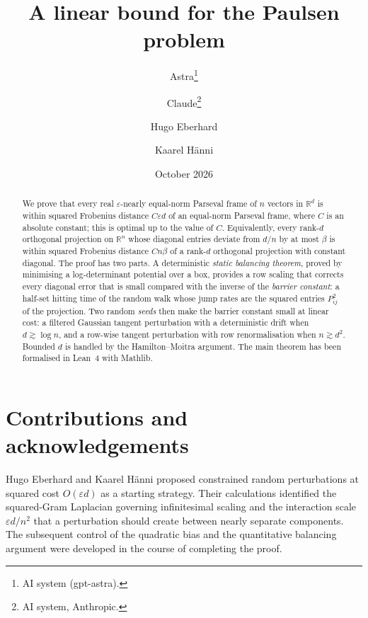 \documentclass[11pt]{article}
\title{A linear bound for the Paulsen problem}
\author{Astra\thanks{AI system (gpt-astra).}
\and Claude\thanks{AI system, Anthropic.}
\and Hugo Eberhard
\and Kaarel H\"anni}
\date{October 2026}
\theoremstyle{definition}
\theoremstyle{remark}
\newcommand{\R}{\mathbb R}
\newcommand{\eps}{\varepsilon}
\numberwithin{equation}{section}
\begin{document}
\maketitle
\vspace{-1.5em}
\begin{abstract}
We prove that every real $\eps$-nearly equal-norm Parseval frame of $n$ vectors
in $\R^d$ is within squared Frobenius distance $C\eps d$ of an equal-norm
Parseval frame, where $C$ is an absolute constant; this is optimal up to the
value of $C$. Equivalently, every rank-$d$ orthogonal projection on $\R^n$ whose
diagonal entries deviate from $d/n$ by at most $\beta$ is within squared
Frobenius distance $Cn\beta$ of a rank-$d$ orthogonal projection with constant
diagonal. The proof has two parts. A deterministic \emph{static balancing
theorem}, proved by minimising a log-determinant potential over a box, provides
a row scaling that corrects every diagonal error that is small compared with the
inverse of the \emph{barrier constant}: a half-set hitting time of the random
walk whose jump rates are the squared entries $P_{ij}^2$ of the projection. Two random \emph{seeds} then make the barrier
constant small at linear cost: a filtered Gaussian tangent perturbation with a
deterministic drift when $d\gtrsim\log n$, and a row-wise tangent perturbation
with row renormalisation when $n\gtrsim d^2$. Bounded $d$ is handled by the
Hamilton--Moitra argument. The main theorem has been formalised in Lean~4 with
Mathlib.
\end{abstract}

\tableofcontents







\appendix



\section*{Contributions and acknowledgements}
Hugo Eberhard and Kaarel H\"anni proposed constrained random perturbations at
squared cost $O(\eps d)$ as a starting strategy. Their calculations identified
the squared-Gram Laplacian governing infinitesimal scaling and the interaction
scale $\eps d/n^2$ that a perturbation should create between nearly separate
components. The subsequent control of the quadratic bias and the quantitative
balancing argument were developed in the course of completing the proof.
\end{document}
